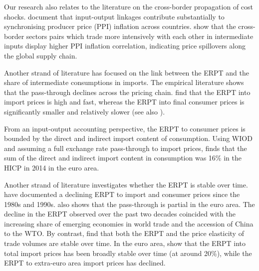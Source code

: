 \documentclass[11pt,a4paper]{article}
\begin{document}
Our research also relates to the literature on the cross-border propagation of cost shocks. 
\cite{Auer2017} document that input-output linkages contribute substantially to synchronising producer price (PPI) inflation across countries. %
\cite{AntoundeAlmeida2016} show that the cross-border sectors pairs which trade more intensively with each other in intermediate inputs display higher PPI inflation correlation, indicating  price spillovers along the global supply chain. 

Another strand of literature has focused on the link between the ERPT and the share of intermediate consumptions in imports. 
The empirical literature shows that the pass-through declines across the pricing chain. \cite{Ortega2020} find that the ERPT into import prices is high and fast, whereas the ERPT into final consumer prices is significantly smaller and relatively slower (see also \cite{Hahn2003, Kunovac2017, BenCheikh2017}).

From an input-output accounting perspective, the ERPT to consumer prices is bounded by the direct and indirect import content of consumption. Using WIOD and assuming a full exchange rate pass-through to import prices, \cite{Schaeffer2019} finds that the sum of the direct and indirect import content in consumption was 16\% in the HICP in 2014 in the euro area.

Another strand of literature investigates whether the ERPT is stable over time. \cite{Campa2008} have documented a declining ERPT to import and consumer prices since the 1980s and 1990s. \cite{Ozyurt2016} also shows that the pass-through is partial in the euro area. The decline in the ERPT observed over the past two decades coincided with the increasing share of emerging economies in world trade and the accession of China to the WTO. By contrast, \cite{Leigh2017} find that both the ERPT and the price elasticity of trade volumes are stable over time. In the euro area, \cite{Ortega2020} show that the ERPT into total import prices has been broadly stable over time (at around 20\%), while the ERPT to extra-euro area import prices has declined.

\end{document}

